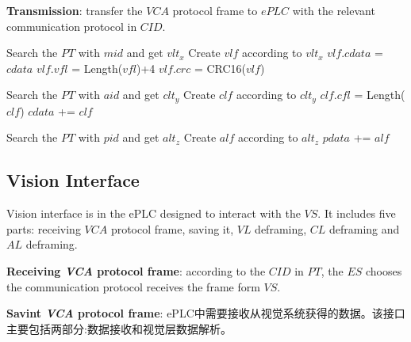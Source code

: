 \documentclass[journal,UTF8]{IEEEtran}
\begin{document}
\textbf{Transmission}: transfer the $VCA$ protocol frame to $ePLC$ with the relevant communication protocol in $CID$.

\begin{algorithm}
	\label{alg1}
	\caption{$VLFraming$}%
	Search the $PT$ with $mid$ and get $vlt_x$\;
	Create $vlf$ according to $vlt_x$\;
    $vlf.cdata$ = $cdata$\; 
	$vlf.vfl$ = Length($vfl$)+4\;
	$vlf.crc$ = CRC16($vlf$)\;		 
\end{algorithm}

\begin{algorithm}
	\label{alg2}
	\caption{$CLFraming$}%
	Search the $PT$ with $aid$ and get $clt_y$\;
	Create $clf$ according to $clt_y$\;
	$clf.cfl$ = Length($clf$)\;	
	$cdata$ += $clf$\;	 
\end{algorithm}
\begin{algorithm}
	\label{alg3}
	\caption{$ALFraming$}%
	Search the $PT$ with $pid$ and get $alt_z$\;
	Create $alf$ according to $alt_z$\;
	$pdata$ += $alf$\;	 
\end{algorithm}

\subsection{Vision Interface}
Vision interface is in the ePLC designed to interact with the $VS$. It includes five parts: receiving $VCA$ protocol frame, saving it, $VL$ deframing, $CL$ deframing and $AL$ deframing.

\textbf{Receiving \emph{VCA} protocol frame}: according to the $CID$ in $PT$, the $ES$ chooses the communication protocol receives the frame form $VS$.

\textbf{Savint \emph{VCA} protocol frame}:  
ePLC中需要接收从视觉系统获得的数据。该接口主要包括两部分:数据接收和视觉层数据解析。
\end{document}
